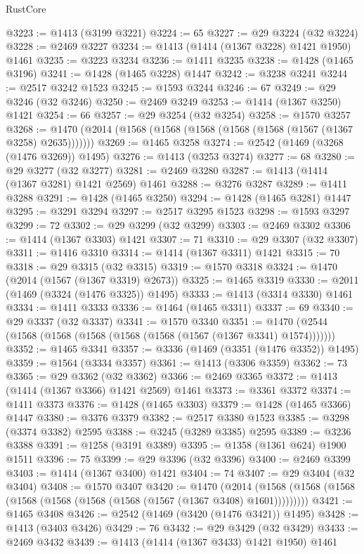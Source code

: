 \begin{lexlean}{RustCore}
\begin{coremodule}
{\begin{coremodule}
{{{{{{{{{{{{{{{{{{{{{{{{{{{{{{{{{{{{{{{{{{{{{{{@3223 := @1413 (@3199 @3221)
@3224 := 65
@3227 := @29 @3224 (@32 @3224)
@3228 := @2469 @3227
@3234 := @1413 (@1414 (@1367 @3228) @1421 @1950) @1461
@3235 := @3223 @3234
@3236 := @1411 @3235
@3238 := @1428 (@1465 @3196)
@3241 := @1428 (@1465 @3228) @1447
@3242 := @3238 @3241
@3244 := @2517 @3242 @1523
@3245 := @1593 @3244
@3246 := 67
@3249 := @29 @3246 (@32 @3246)
@3250 := @2469 @3249
@3253 := @1414 (@1367 @3250) @1421
@3254 := 66
@3257 := @29 @3254 (@32 @3254)
@3258 := @1570 @3257
@3268 := @1470 (@2014 (@1568 (@1568 (@1568 (@1568 (@1568 (@1567 (@1367 @3258) @2635)))))))
@3269 := @1465 @3258
@3274 := @2542 (@1469 (@3268 (@1476 @3269)) @1495)
@3276 := @1413 (@3253 @3274)
@3277 := 68
@3280 := @29 @3277 (@32 @3277)
@3281 := @2469 @3280
@3287 := @1413 (@1414 (@1367 @3281) @1421 @2569) @1461
@3288 := @3276 @3287
@3289 := @1411 @3288
@3291 := @1428 (@1465 @3250)
@3294 := @1428 (@1465 @3281) @1447
@3295 := @3291 @3294
@3297 := @2517 @3295 @1523
@3298 := @1593 @3297
@3299 := 72
@3302 := @29 @3299 (@32 @3299)
@3303 := @2469 @3302
@3306 := @1414 (@1367 @3303) @1421
@3307 := 71
@3310 := @29 @3307 (@32 @3307)
@3311 := @1416 @3310
@3314 := @1414 (@1367 @3311) @1421
@3315 := 70
@3318 := @29 @3315 (@32 @3315)
@3319 := @1570 @3318
@3324 := @1470 (@2014 (@1567 (@1367 @3319) @2673))
@3325 := @1465 @3319
@3330 := @2011 (@1469 (@3324 (@1476 @3325)) @1495)
@3333 := @1413 (@3314 @3330) @1461
@3334 := @1411 @3333
@3336 := @1464 (@1465 @3311)
@3337 := 69
@3340 := @29 @3337 (@32 @3337)
@3341 := @1570 @3340
@3351 := @1470 (@2544 (@1568 (@1568 (@1568 (@1568 (@1568 (@1567 (@1367 @3341) @1574)))))))
@3352 := @1465 @3341
@3357 := @3336 (@1469 (@3351 (@1476 @3352)) @1495)
@3359 := @1564 (@3334 @3357)
@3361 := @1413 (@3306 @3359)
@3362 := 73
@3365 := @29 @3362 (@32 @3362)
@3366 := @2469 @3365
@3372 := @1413 (@1414 (@1367 @3366) @1421 @2569) @1461
@3373 := @3361 @3372
@3374 := @1411 @3373
@3376 := @1428 (@1465 @3303)
@3379 := @1428 (@1465 @3366) @1447
@3380 := @3376 @3379
@3382 := @2517 @3380 @1523
@3385 := @3298 (@3374 @3382) @2595
@3388 := @3245 (@3289 @3385) @2595
@3389 := @3236 @3388
@3391 := @1258 (@3191 @3389)
@3395 := @1358 (@1361 @624) @1900 @1511
@3396 := 75
@3399 := @29 @3396 (@32 @3396)
@3400 := @2469 @3399
@3403 := @1414 (@1367 @3400) @1421
@3404 := 74
@3407 := @29 @3404 (@32 @3404)
@3408 := @1570 @3407
@3420 := @1470
    (@2014 (@1568 (@1568 (@1568 (@1568 (@1568 (@1568 (@1568 (@1567 (@1367 @3408) @1601)))))))))
@3421 := @1465 @3408
@3426 := @2542 (@1469 (@3420 (@1476 @3421)) @1495)
@3428 := @1413 (@3403 @3426)
@3429 := 76
@3432 := @29 @3429 (@32 @3429)
@3433 := @2469 @3432
@3439 := @1413 (@1414 (@1367 @3433) @1421 @1950) @1461
}}}}}}}}}}}}}}}}}}}}}}}}}}}}}}}}}}}}}}}}}}}}}}}
\end{coremodule}}
\end{coremodule}
\end{lexlean}
